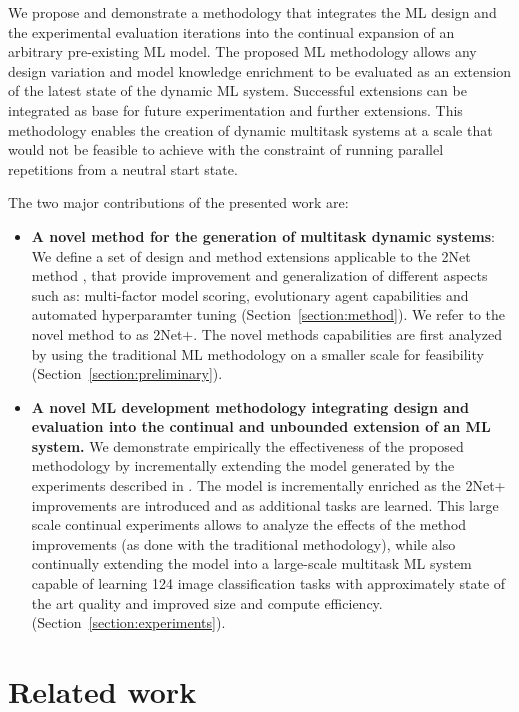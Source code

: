 \documentclass{article} \usepackage{iclr2023_conference,times}
\newcommand{\method}{2Net+\xspace}
\begin{document}
We propose and demonstrate a methodology that integrates the ML design and the experimental evaluation iterations into the continual expansion of an arbitrary pre-existing ML model.
The proposed ML methodology allows any design variation and model knowledge enrichment to be evaluated as an extension of the latest state of the dynamic ML system.
Successful extensions can be integrated as base for future  experimentation and further extensions.
This methodology enables the creation of dynamic multitask systems at a scale that would not be feasible to achieve with the constraint of running parallel repetitions from a neutral start state.

The two major contributions of the presented work are:
\begin{itemize}
    \item \textbf{A novel method for the generation of multitask dynamic systems}: We define a set of design and method extensions applicable to the 2Net method \citep{Gesmundo2022munet2},
    that provide improvement and generalization of different aspects such as: multi-factor model scoring,
    evolutionary agent capabilities and automated hyperparamter tuning (Section~\ref{section:method}).
    We refer to the novel method to as \method.
    The novel methods capabilities are first analyzed by using the traditional ML methodology on a smaller scale for feasibility (Section~\ref{section:preliminary}).
    \item \textbf{A novel ML development methodology integrating design and evaluation into the continual and unbounded extension of an ML system.}
    We  demonstrate empirically the effectiveness of the proposed methodology by incrementally extending the model generated by the experiments described in \cite{Gesmundo2022munet2}.
The model is incrementally enriched as the \method improvements are introduced and as additional tasks are learned.
    This large scale continual experiments allows to analyze the effects of the method improvements (as done with the traditional methodology), while also continually extending the model into a large-scale multitask ML system capable of learning 124 image classification tasks with approximately state of the art quality and improved size and compute efficiency.
    (Section~\ref{section:experiments}).
\end{itemize}

\section{Related work}
\end{document}
